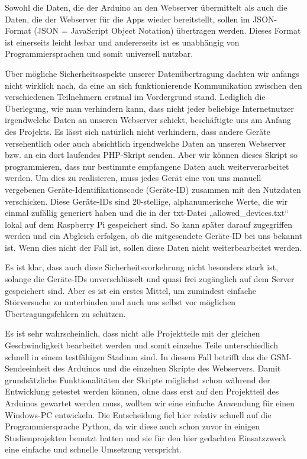 Sowohl die Daten, die der Arduino an den Webserver übermittelt als auch die Daten, die der Webserver für die Apps wieder bereitstellt, sollen im JSON-Format (JSON = JavaScript Object Notation) übertragen werden. Dieses Format ist einerseits leicht lesbar und andererseits ist es unabhängig von Programmiersprachen und somit universell nutzbar.

Über mögliche Sicherheitsaspekte unserer Datenübertragung dachten wir anfangs nicht wirklich nach, da eine an sich funktionierende Kommunikation zwischen den verschiedenen Teilnehmern erstmal im Vordergrund stand. Lediglich die Überlegung, wie man verhindern kann, dass nicht jeder beliebige Internetnutzer irgendwelche Daten an unseren Webserver schickt, beschäftigte uns am Anfang des Projekts. Es lässt sich natürlich nicht verhindern, dass andere Geräte versehentlich oder auch absichtlich irgendwelche Daten an unseren Webserver bzw. an ein dort laufendes PHP-Skript senden. Aber wir können dieses Skript so programmieren, dass nur bestimmte empfangene Daten auch weiterverarbeitet werden. Um dies zu realisieren, muss jedes Gerät eine von uns manuell vergebenen Geräte-Identifikationscode (Geräte-ID) zusammen mit den Nutzdaten verschicken. Diese Geräte-IDs sind 20-stellige, alphanumerische Werte, die wir einmal zufällig generiert haben und die in der txt-Datei „allowed\_devices.txt“ lokal auf dem Raspberry Pi gespeichert sind. So kann später darauf zugegriffen werden und ein Abgleich erfolgen, ob die mitgesendete Geräte-ID bei uns bekannt ist. Wenn dies nicht der Fall ist, sollen diese Daten nicht weiterbearbeitet werden.

Es ist klar, dass auch diese Sicherheitsvorkehrung nicht besonders stark ist, solange die Geräte-IDs unverschlüsselt und quasi frei zugänglich auf dem Server gespeichert sind. Aber es ist ein erstes Mittel, um zumindest einfache Störversuche zu unterbinden und auch uns selbst vor möglichen Übertragungsfehlern zu schützen.

Es ist sehr wahrscheinlich, dass nicht alle Projektteile mit der gleichen Geschwindigkeit bearbeitet werden und somit einzelne Teile unterschiedlich schnell in einem testfähigen Stadium sind. In diesem Fall betrifft das die GSM-Sendeeinheit des Arduinos und die einzelnen Skripte des Webservers. Damit grundsätzliche Funktionalitäten der Skripte möglichst schon während der Entwicklung getestet werden können, ohne dass erst auf den Projektteil des Arduinos gewartet werden muss, wollten wir eine einfache Anwendung für einen Windows-PC entwickeln. Die Entscheidung fiel hier relativ schnell auf die Programmiersprache Python, da wir diese auch schon zuvor in einigen Studienprojekten benutzt hatten und sie für den hier gedachten Einsatzzweck eine einfache und schnelle Umsetzung verspricht.

